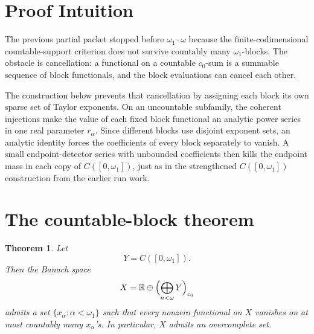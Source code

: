 \documentclass[11pt]{article}
\newtheorem{theorem}{Theorem}
\newcommand{\R}{\mathbb R}
\begin{document}
\section{Proof Intuition}

The previous partial packet stopped before \(\omega_1\cdot\omega\) because the
finite-codimensional countable-support criterion does not survive countably
many \(\omega_1\)-blocks.  The obstacle is cancellation: a functional on a
countable \(c_0\)-sum is a summable sequence of block functionals, and the
block evaluations can cancel each other.

The construction below prevents that cancellation by assigning each block its
own sparse set of Taylor exponents.  On an uncountable subfamily, the coherent
injections make the value of each fixed block functional an analytic power
series in one real parameter \(r_\alpha\).  Since different blocks use
disjoint exponent sets, an analytic identity forces the coefficients of every
block separately to vanish.  A small endpoint-detector series with unbounded
coefficients then kills the endpoint mass in each copy of \(C([0,\omega_1])\),
just as in the strengthened \(C([0,\omega_1])\) construction from the earlier
run work.

\section{The countable-block theorem}

\begin{theorem}\label{thm:model}
Let
\[
   Y=C([0,\omega_1]).
\]
Then the Banach space
\[
   X=\R\oplus \Bigl(\bigoplus_{n<\omega}Y\Bigr)_{c_0}
\]
admits a set \(\{x_\alpha:\alpha<\omega_1\}\) such that every nonzero
functional on \(X\) vanishes on at most countably many \(x_\alpha\)'s.  In
particular, \(X\) admits an overcomplete set.
\end{theorem}
\end{document}

